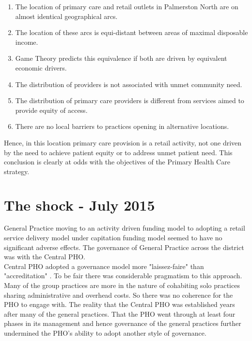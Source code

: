 \documentclass[11pt,a4paper]{article}
\begin{document}
\begin{enumerate}
\item The location of primary care and retail outlets in Palmerston North are on almost identical geographical arcs.
\item The location of these arcs is equi-distant between areas of maximal disposable income.
\item Game Theory predicts this equivalence if both are driven by equivalent economic drivers.
\item The distribution of providers is not associated with unmet community need.
\item The distribution of primary care providers is different from services aimed to provide equity of access.
\item There are no local barriers to practices opening in alternative locations.
\end{enumerate}

Hence, in this location primary care provision is a retail activity, not one driven by the need to achieve patient equity or to address unmet patient need. This conclusion is clearly at odds with the objectives of the Primary Health Care strategy.

\pagebreak

\section{The shock - July 2015}
General Practice moving to an activity driven funding model to adopting a retail service delivery model under capitation funding model seemed to have no significant adverse effects. The governance of General Practice across the district was with the Central PHO.\\

Central PHO adopted a governance model more "laissez-faire" than "accreditation" \citep{greenwood2007european}. To be fair there was considerable pragmatism to this approach. Many of the group practices are more in the nature of cohabiting solo practices sharing administrative and overhead costs. So there was no coherence for the PHO to engage with. The reality that the Central PHO was established years after many of the general practices. That the PHO went through at least four phases in its management and hence governance of the general practices further undermined the PHO's ability to adopt another style of governance.\\
\end{document}

